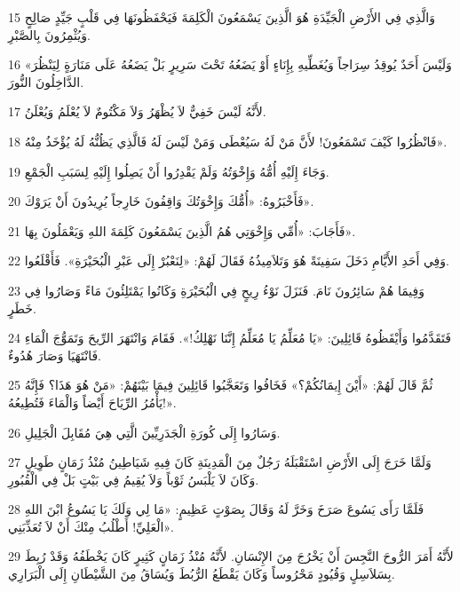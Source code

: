 \par 15 وَالَّذِي فِي الأَرْضِ الْجَيِّدَةِ هُوَ الَّذِينَ يَسْمَعُونَ الْكَلِمَةَ فَيَحْفَظُونَهَا فِي قَلْبٍ جَيِّدٍ صَالِحٍ وَيُثْمِرُونَ بِالصَّبْرِ.
\par 16 «وَلَيْسَ أَحَدٌ يُوقِدُ سِرَاجاً وَيُغَطِّيهِ بِإِنَاءٍ أَوْ يَضَعُهُ تَحْتَ سَرِيرٍ بَلْ يَضَعُهُ عَلَى مَنَارَةٍ لِيَنْظُرَ الدَّاخِلُونَ النُّورَ.
\par 17 لأَنَّهُ لَيْسَ خَفِيٌّ لاَ يُظْهَرُ وَلاَ مَكْتُومٌ لاَ يُعْلَمُ وَيُعْلَنُ.
\par 18 فَانْظُرُوا كَيْفَ تَسْمَعُونَ! لأَنَّ مَنْ لَهُ سَيُعْطَى وَمَنْ لَيْسَ لَهُ فَالَّذِي يَظُنُّهُ لَهُ يُؤْخَذُ مِنْهُ».
\par 19 وَجَاءَ إِلَيْهِ أُمُّهُ وَإِخْوَتُهُ وَلَمْ يَقْدِرُوا أَنْ يَصِلُوا إِلَيْهِ لِسَبَبِ الْجَمْعِ.
\par 20 فَأَخْبَرُوهُ: «أُمُّكَ وَإِخْوَتُكَ وَاقِفُونَ خَارِجاً يُرِيدُونَ أَنْ يَرَوْكَ».
\par 21 فَأَجَابَ: «أُمِّي وَإِخْوَتِي هُمُ الَّذِينَ يَسْمَعُونَ كَلِمَةَ اللهِ وَيَعْمَلُونَ بِهَا».
\par 22 وَفِي أَحَدِ الأَيَّامِ دَخَلَ سَفِينَةً هُوَ وَتَلاَمِيذُهُ فَقَالَ لَهُمْ: «لِنَعْبُرْ إِلَى عَبْرِ الْبُحَيْرَةِ». فَأَقْلَعُوا.
\par 23 وَفِيمَا هُمْ سَائِرُونَ نَامَ. فَنَزَلَ نَوْءُ رِيحٍ فِي الْبُحَيْرَةِ وَكَانُوا يَمْتَلِئُونَ مَاءً وَصَارُوا فِي خَطَرٍ.
\par 24 فَتَقَدَّمُوا وَأَيْقَظُوهُ قَائِلِينَ: «يَا مُعَلِّمُ يَا مُعَلِّمُ إِنَّنَا نَهْلِكُ!». فَقَامَ وَانْتَهَرَ الرِّيحَ وَتَمَوُّجَ الْمَاءِ فَانْتَهَيَا وَصَارَ هُدُوءٌ.
\par 25 ثُمَّ قَالَ لَهُمْ: «أَيْنَ إِيمَانُكُمْ؟» فَخَافُوا وَتَعَجَّبُوا قَائِلِينَ فِيمَا بَيْنَهُمْ: «مَنْ هُوَ هَذَا؟ فَإِنَّهُ يَأْمُرُ الرِّيَاحَ أَيْضاً وَالْمَاءَ فَتُطِيعُهُ!».
\par 26 وَسَارُوا إِلَى كُورَةِ الْجَدَرِيِّينَ الَّتِي هِيَ مُقَابِلَ الْجَلِيلِ.
\par 27 وَلَمَّا خَرَجَ إِلَى الأَرْضِ اسْتَقْبَلَهُ رَجُلٌ مِنَ الْمَدِينَةِ كَانَ فِيهِ شَيَاطِينُ مُنْذُ زَمَانٍ طَوِيلٍ وَكَانَ لاَ يَلْبَسُ ثَوْباً وَلاَ يُقِيمُ فِي بَيْتٍ بَلْ فِي الْقُبُورِ.
\par 28 فَلَمَّا رَأَى يَسُوعَ صَرَخَ وَخَرَّ لَهُ وَقَالَ بِصَوْتٍ عَظِيمٍ: «مَا لِي وَلَكَ يَا يَسُوعُ ابْنَ اللهِ الْعَلِيِّ! أَطْلُبُ مِنْكَ أَنْ لاَ تُعَذِّبَنِي».
\par 29 لأَنَّهُ أَمَرَ الرُّوحَ النَّجِسَ أَنْ يَخْرُجَ مِنَ الإِنْسَانِ. لأَنَّهُ مُنْذُ زَمَانٍ كَثِيرٍ كَانَ يَخْطَفُهُ وَقَدْ رُبِطَ بِسَلاَسِلٍ وَقُيُودٍ مَحْرُوساً وَكَانَ يَقْطَعُ الرُّبُطَ وَيُسَاقُ مِنَ الشَّيْطَانِ إِلَى الْبَرَارِي.
